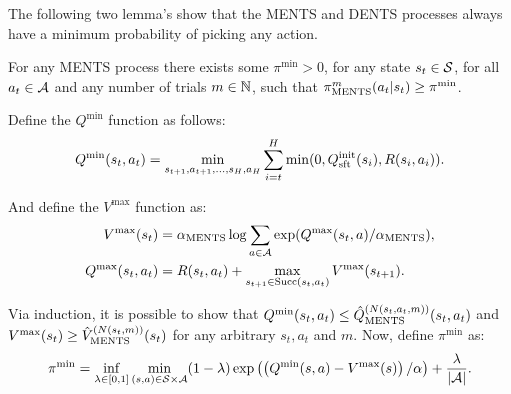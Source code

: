         
        The following two lemma's show that the MENTS and DENTS processes always have a minimum probability of picking any action. 
        \begin{lemma} \label{lem:min_prob_ments}
            For any MENTS process there exists some $\pi^{\min}>0$, for any state $s_t\in\mathcal{S}$, for all $a_t\in\mathcal{A}$ and any number of trials $m\in\mathbb{N}$, such that ${\pi^{m}_{{\textnormal{MENTS}}}}(a_t|s_t)\geq\pi^{\min}$.
        \end{lemma}
        \begin{proofoutline}
            Define the $Q^{\min}$ function as follows:
            \begin{align}
                Q^{\min}(s_t,a_t) = \min_{s_{t+1},a_{t+1},...,s_H,a_H} \sum_{i=t}^H \min(0, Q^{\text{init}}_{{\textnormal{sft}}}(s_i), R(s_i,a_i)).
            \end{align}
            
            And define the $V^{\max}$ function as:
            \begin{align}
                V^{\max}(s_t) &= {\alpha_{{\textnormal{MENTS}}}} \log \sum_{a\in\mathcal{A}} \exp (Q^{\max}(s_t,a)/{\alpha_{{\textnormal{MENTS}}}}), \label{appeq:vmax} \\
                Q^{\max}(s_t,a_t) &= R(s_t,a_t)+\max_{s_{t+1}\in{\textnormal{Succ}(s_t,a_t)}} V^{\max}(s_{t+1}).
            \end{align}
            
            Via induction, it is possible to show that $Q^{\min}(s_t,a_t)\leq {\hat{Q}^{(N(s_t,a_t,m))}_{{\textnormal{MENTS}}}}(s_t,a_t)$ and $V^{\max}(s_t)\geq {\hat{V}^{(N(s_t,m))}_{{\textnormal{MENTS}}}}(s_t)$ for any arbitrary $s_t,a_t$ and $m$. Now, define $\pi^{\min}$ as:
            \begin{align}
                \pi^{\min} = \inf_{\lambda\in[0,1]} \min_{(s,a)\in\mathcal{S}\times\mathcal{A}} (1-\lambda) \exp\left(\left(Q^{\min}(s,a)-V^{\max}(s)\right)/\alpha\right) + \frac{\lambda}{|\mathcal{A}|}. \label{eq:pi_min}
            \end{align}
            

\end{proofoutline}
